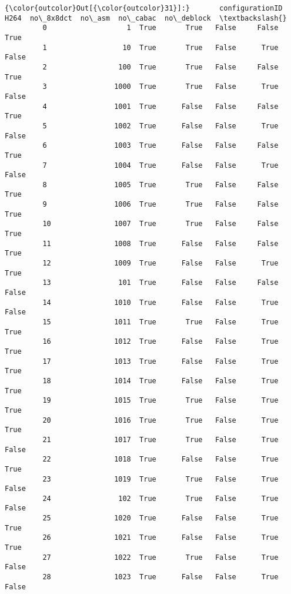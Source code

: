 \documentclass[11pt]{article}
\begin{document}
\begin{Verbatim}[commandchars=\\\{\}]
{\color{outcolor}Out[{\color{outcolor}31}]:}       configurationID  H264  no\_8x8dct  no\_asm  no\_cabac  no\_deblock  \textbackslash{}
         0                   1  True       True   False     False        True   
         1                  10  True       True   False      True       False   
         2                 100  True       True   False     False        True   
         3                1000  True       True   False      True       False   
         4                1001  True      False   False     False        True   
         5                1002  True      False   False      True       False   
         6                1003  True      False   False     False        True   
         7                1004  True      False   False      True       False   
         8                1005  True       True   False     False        True   
         9                1006  True       True   False     False        True   
         10               1007  True       True   False     False        True   
         11               1008  True      False   False     False        True   
         12               1009  True      False   False      True        True   
         13                101  True      False   False     False       False   
         14               1010  True      False   False      True       False   
         15               1011  True       True   False      True        True   
         16               1012  True      False   False      True        True   
         17               1013  True      False   False      True        True   
         18               1014  True      False   False      True        True   
         19               1015  True       True   False      True        True   
         20               1016  True       True   False      True        True   
         21               1017  True       True   False      True       False   
         22               1018  True      False   False      True        True   
         23               1019  True       True   False      True       False   
         24                102  True       True   False      True       False   
         25               1020  True      False   False      True        True   
         26               1021  True      False   False      True        True   
         27               1022  True       True   False      True       False   
         28               1023  True      False   False      True       False   

\end{Verbatim}
\end{document}
